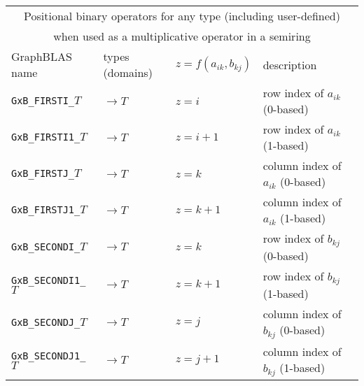 \documentclass[12pt]{article}
\begin{document}
\vspace{0.2in}
{\footnotesize
\begin{tabular}{|llll|}
\hline
\multicolumn{4}{|c|}{Positional binary operators for any type (including user-defined)} \\
\multicolumn{4}{|c|}{when used as a multiplicative operator in a semiring} \\
\hline
GraphBLAS name            & types (domains)   & $z=f(a_{ik},b_{kj})$      & description \\
\hline
\verb'GxB_FIRSTI_'$T$    & $ \rightarrow T$  & $z = i$       & row index of $a_{ik}$ (0-based) \\
\verb'GxB_FIRSTI1_'$T$   & $ \rightarrow T$  & $z = i+1$     & row index of $a_{ik}$ (1-based) \\
\verb'GxB_FIRSTJ_'$T$    & $ \rightarrow T$  & $z = k$       & column index of $a_{ik}$ (0-based) \\
\verb'GxB_FIRSTJ1_'$T$   & $ \rightarrow T$  & $z = k+1$     & column index of $a_{ik}$ (1-based) \\
\verb'GxB_SECONDI_'$T$   & $ \rightarrow T$  & $z = k$       & row index of $b_{kj}$ (0-based) \\
\verb'GxB_SECONDI1_'$T$  & $ \rightarrow T$  & $z = k+1$     & row index of $b_{kj}$ (1-based) \\
\verb'GxB_SECONDJ_'$T$   & $ \rightarrow T$  & $z = j$       & column index of $b_{kj}$ (0-based) \\
\verb'GxB_SECONDJ1_'$T$  & $ \rightarrow T$  & $z = j+1$     & column index of $b_{kj}$ (1-based) \\
\hline
\end{tabular}
}
\end{document}
